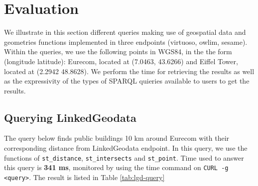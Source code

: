 \begin{table}[!htbp]
\end{table}


\section{Evaluation}
\label{sec:geoqueries}

We illustrate in this section different queries making use of geospatial data and geometries functions implemented in three endpoints (virtuoso, owlim, sesame). Within the queries, we use the following points in WGS84, in the the form (longitude latitude): Eurecom, located at (7.0463, 43.6266) and Eiffel Tower, located at (2.2942 48.8628). We perform the time for retrieving the results as well as the expressivity of the types of SPARQL quieries available to users to get the results.

\subsection{Querying LinkedGeodata}
\label{sec:linkedgeodata}

The query below finds public buildings 10 km around Eurecom with their corresponding distance from LinkedGeodata endpoint. In this query, we use the functions of \texttt{st\_distance}, \texttt{st\_intersects} and \texttt{st\_point}. Time used to answer this query is \textbf{341 ms}, monitored by using the time command on \texttt{CURL -g <query>}. The result is listed in Table \ref{tab:lgd-query}

